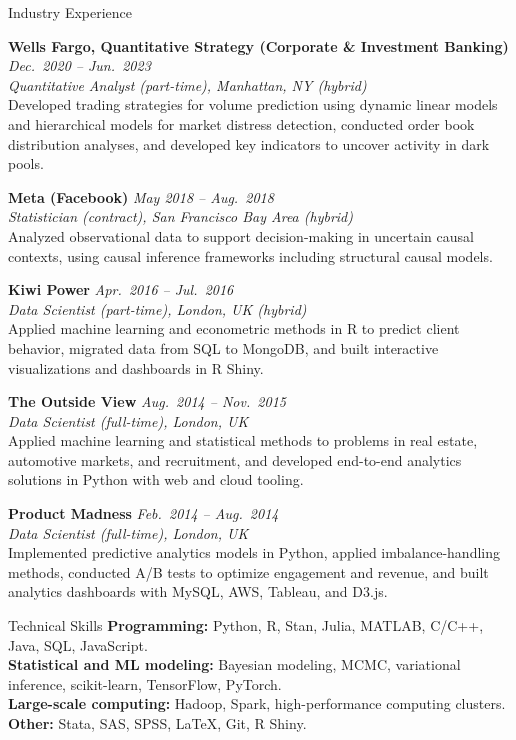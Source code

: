 \documentclass{resume}
\begin{document}
\begin{rSection}{Industry Experience}

{\bf Wells Fargo, Quantitative Strategy (Corporate \& Investment Banking)} \hfill {\em Dec.\ 2020 -- Jun.\ 2023}\\
\textit{Quantitative Analyst (part-time), Manhattan, NY (hybrid)}\\
{\small Developed trading strategies for volume prediction using dynamic linear models and hierarchical models for market distress detection, conducted order book distribution analyses, and developed key indicators to uncover activity in dark pools.}

{\bf Meta (Facebook)} \hfill {\em May 2018 -- Aug.\ 2018}\\
\textit{Statistician (contract), San Francisco Bay Area (hybrid)}\\
{\small Analyzed observational data to support decision-making in uncertain causal contexts, using causal inference frameworks including structural causal models.}

{\bf Kiwi Power} \hfill {\em Apr.\ 2016 -- Jul.\ 2016}\\
\textit{Data Scientist (part-time), London, UK (hybrid)}\\
{\small Applied machine learning and econometric methods in R to predict client behavior, migrated data from SQL to MongoDB, and built interactive visualizations and dashboards in R Shiny.}

{\bf The Outside View} \hfill {\em Aug.\ 2014 -- Nov.\ 2015}\\
\textit{Data Scientist (full-time), London, UK}\\
{\small Applied machine learning and statistical methods to problems in real estate, automotive markets, and recruitment, and developed end-to-end analytics solutions in Python with web and cloud tooling.}

{\bf Product Madness} \hfill {\em Feb.\ 2014 -- Aug.\ 2014}\\
\textit{Data Scientist (full-time), London, UK}\\
{\small Implemented predictive analytics models in Python, applied imbalance-handling methods, conducted A/B tests to optimize engagement and revenue, and built analytics dashboards with MySQL, AWS, Tableau, and D3.js.}

\end{rSection}

\begin{rSection}{Technical Skills}
\textbf{Programming:} Python, R, Stan, Julia, MATLAB, C/C++, Java, SQL, JavaScript.\\
\textbf{Statistical and ML modeling:} Bayesian modeling, MCMC, variational inference, scikit-learn, TensorFlow, PyTorch.\\
\textbf{Large-scale computing:} Hadoop, Spark, high-performance computing clusters.\\
\textbf{Other:} Stata, SAS, SPSS, \LaTeX, Git, R Shiny.
\end{rSection}
\end{document}
